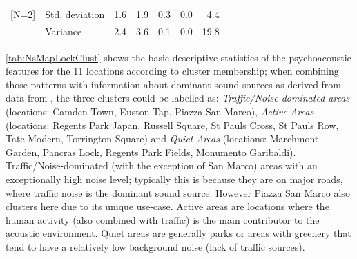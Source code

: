 \begin{table}[!h]
\begin{tabular}{llrrrrr}
      {[}N=2]                        & Std. deviation     & 1.6                                       & 1.9                           & 0.3                           & 0.0                     & 4.4                       \\
                                     & Variance           & 2.4                                       & 3.6                           & 0.1                           & 0.0                     & 19.8                      \\
      \bottomrule
    \end{tabular}

\end{table}


\cref{tab:NsMapLockClust} shows the basic descriptive statistics of the psychoacoustic features for the 11 locations according to cluster membership; when combining those patterns with information about dominant sound sources as derived from data from \citet{Mitchell2020Soundscape}, the three clusters could be labelled as: \emph{Traffic/Noise-dominated areas} (locations: Camden Town, Euston Tap, Piazza San Marco), \emph{Active Areas} (locations: Regents Park Japan, Russell Square, St Pauls Cross, St Pauls Row, Tate Modern, Torrington Square) and \emph{Quiet Areas} (locations: Marchmont Garden, Pancras Lock, Regents Park Fields, Monumento Garibaldi). Traffic/Noise-dominated (with the exception of San Marco) areas with an exceptionally high noise level; typically this is because they are on major roads, where traffic noise is the dominant sound source. However Piazza San Marco also clusters here due to its unique use-case. Active areas are locations where the human activity (also combined with traffic) is the main contributor to the acoustic environment. Quiet areas are generally parks or areas with greenery that tend to have a relatively low background noise (lack of traffic sources).

